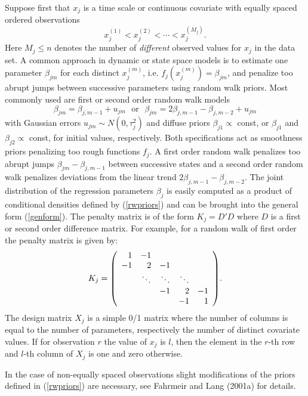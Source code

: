 \documentclass[11pt,a4paper,twoside]{bayesxarticle}
\begin{document}
Suppose first that $x_j$ is a time scale or continuous covariate
with equally spaced ordered observations
$$
x_j^{(1)} < x_j^{(2)} < \cdots < x_j^{(M_j)}.
$$
Here $M_j \leq n$ denotes the number of {\em different} observed
values for $x_j$ in the data set. A common approach in dynamic or
state space models is to estimate one parameter $\beta_{jm}$ for
each distinct $x_j^{(m)}$, i.e. $f_j(x_j^{(m)}) = \beta_{jm}$, and
penalize too abrupt jumps between successive parameters using
random walk priors. Most commonly used are first or second order
random walk models
\begin{equation}
\label{rwpriors}
\beta_{jm}=\beta_{j,m-1}+u_{jm}\,\,\,\,\mbox{or}\,\,\,\,\beta_{jm}=2\beta_{j,m-1}-\beta_{j,m-2}+u_{jm}
\end{equation}
with Gaussian errors $u_{jm}\sim N(0,\tau_j^{2})$ and diffuse
priors $\beta_{j1}\propto$ const, or $\beta_{j1}$ and
$\beta_{j2}\propto$ const, for initial values, respectively. Both
specifications act as smoothness priors penalizing too rough
functions $f_j$. A first order random walk penalizes too abrupt
jumps $\beta_{jm}-\beta_{j,m-1}$ between successive states and a
second order random walk penalizes deviations from the linear
trend $2 \beta_{j,m-1}-\beta_{j,m-2}$. The joint distribution of
the regression parameters $\beta_j$ is easily computed as a
product of conditional densities defined by (\ref{rwpriors}) and
can be brought into the general form (\ref{genform}). The penalty
matrix is of the form $K_j=D'D$ where $D$ is a first or second
order difference matrix. For example, for a random walk of first
order the penalty matrix is given by:
$$
K_j = {\footnotesize \left(
\begin{array}{rrrrr}
 1 & -1 & & &  \\
-1 & 2 & -1 & & \\
 &  \ddots & \ddots & \ddots &  \\
 & & -1 & 2 & -1 \\
  & & & -1 & 1
\end{array}
\right) }.
$$
The design matrix $X_j$ is a simple 0/1 matrix where the number of
columns is equal to the number of parameters, respectively the
number of distinct covariate values. If for observation $r$ the
value of $x_j$ is $l$, then the element in the $r$-th row and
$l$-th column of $X_j$ is one and zero otherwise.

In the case of non-equally spaced observations slight
modifications of the priors defined in (\ref{rwpriors}) are
necessary, see Fahrmeir and Lang (2001a) for details.
\end{document}
